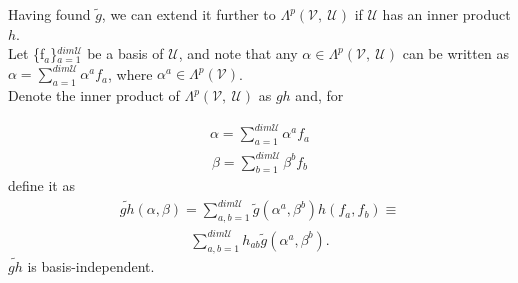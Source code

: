 \documentclass[12pt,a4paper]{article}
\begin{document}
Having found $\widetilde{g}$, we can extend it further to  $\Lambda^{p}(\mathcal{V}, \ \mathcal{U})$ if $\mathcal{U}$ has an inner product $h$. \\Let \{f$_a$\}$^{dim \mathcal{U}}_{a=1}$ be a basis of $\mathcal{U}$, and note that any $\alpha \in \Lambda^{p}(\mathcal{V},\ \mathcal{U})$ can be written as $\alpha = \sum^{dim \mathcal{U}}_{a =1} \alpha^a f_a$, where $\alpha^a \in \Lambda^{p}(\mathcal{V})$. \\Denote the inner product of $\Lambda^{p}(\mathcal{V},\ \mathcal{U})$ as $gh$ and, for 

\begin{align*}
\alpha = \sum^{dim \mathcal{U}}_{a=1} \alpha^a f_a
\end{align*}
\begin{align*}
\beta = \sum^{dim \mathcal{U}}_{b=1} \beta^b f_b
\end{align*}
define it as 
\begin{align*}
\widetilde{gh} (\alpha, \beta) = \sum^{dim \mathcal{U}}_{a, b =1} \widetilde{g} (\alpha^a, \beta^b) h(f_a, f_b) \equiv
\end{align*}
\begin{align*}
 \sum^{dim \mathcal{U}}_{a,b = 1} h_{ab} \widetilde{g} (\alpha^a, \beta^b).
\end{align*}
$\widetilde{gh}$ is basis-independent.
\end{document}
